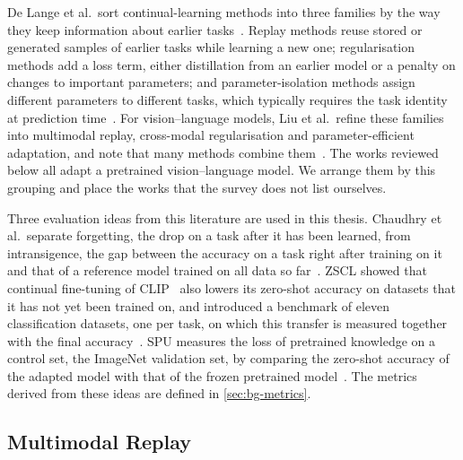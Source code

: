 De Lange et al.\ sort continual-learning methods into three families by the way they keep information about earlier tasks~\cite[Sec.~3]{delange2022}.
Replay methods reuse stored or generated samples of earlier tasks while learning a new one; regularisation methods add a loss term, either distillation from an earlier model or a penalty on changes to important parameters; and parameter-isolation methods assign different parameters to different tasks, which typically requires the task identity at prediction time~\cite[Sec.~3.1--3.3]{delange2022}.
For vision--language models, Liu et al.\ refine these families into multimodal replay, cross-modal regularisation and parameter-efficient adaptation, and note that many methods combine them~\cite[Sec.~4]{liu2026continuallearningvlmssurvey}.
The works reviewed below all adapt a pretrained vision--language model.
We arrange them by this grouping and place the works that the survey does not list ourselves.

Three evaluation ideas from this literature are used in this thesis.
Chaudhry et al.\ separate forgetting, the drop on a task after it has been learned, from intransigence, the gap between the accuracy on a task right after training on it and that of a reference model trained on all data so far~\cite{Chaudhry_2018}.
ZSCL showed that continual fine-tuning of CLIP~\cite{radford2021learningtransferablevisualmodels} also lowers its zero-shot accuracy on datasets that it has not yet been trained on, and introduced a benchmark of eleven classification datasets, one per task, on which this transfer is measured together with the final accuracy~\cite{zheng2023preventingzeroshottransferdegradation}.
SPU measures the loss of pretrained knowledge on a control set, the ImageNet validation set, by comparing the zero-shot accuracy of the adapted model with that of the frozen pretrained model~\cite{Zhang_2024_CVPR}.
The metrics derived from these ideas are defined in \cref{sec:bg-metrics}.

\subsection{Multimodal Replay}

